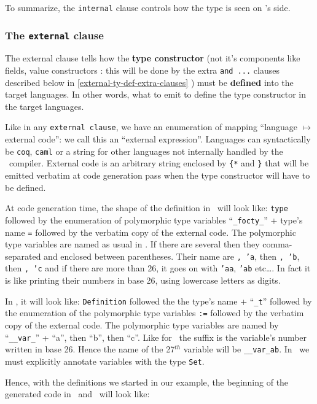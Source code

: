 \medskip
To summarize, the {\tt internal} clause controls how the type is seen
on \focalize's side.


\subsubsection{The {\tt external} clause}
The external clause tells how the {\bf type constructor} (not it's
components like fields, value constructors : this will be done by the
extra {\tt and ...} clauses described below in
\ref{external-ty-def-extra-clauses} ) must be {\bf defined} into the
target languages. In other words, what to emit to define the type
constructor in the target languages.

Like in any {\tt external clause}, we have an enumeration of mapping
``language $\mapsto$ external code'': we call this an ``external
expression''.
Languages can syntactically be
{\tt coq}, {\tt caml} or a string for other languages not internally
handled by the \focalize\ compiler. External code is an arbitrary
string enclosed by {\tt \{*} and {\tt *\}} that will be emitted
verbatim at code generation pass when the type constructor will have
to be defined.

At code generation time, the shape of the definition in \ocaml\ will
look like: {\tt type} followed by the enumeration of polymorphic type
variables ``{\tt \_focty\_}'' + type's name {\tt =} followed by the
verbatim copy of the external code. The polymorphic type variables are
named as usual in \ocaml. If there are several then they
comma-separated and enclosed between parentheses. Their name are
{\tt, 'a}, then {\tt, 'b}, then {\tt, 'c} and if there are more than
26, it goes on with {\tt 'aa}, {\tt 'ab} etc\ldots. In fact it is like
printing their numbers in base 26, using lowercase letters as digits.

In \coq, it will look like: {\tt Definition} followed the the type's
name + ``{\tt \_t}'' followed by the enumeration of the polymorphic
type variables {\tt :=} followed by the verbatim copy of the
external code. The polymorphic type variables are named by
``{\tt \_\_var\_}'' + ``a'', then ``b'', then ``c''. Like for \ocaml\
the suffix is the variable's number written in base 26. Hence the name
of the 27$^{th}$ variable will be {\tt \_\_var\_ab}. In \coq\, we must
explicitly annotate variables with the type {\tt Set}.

Hence, with the definitions we started in our example, the beginning
of the generated code in \ocaml\ and \coq\ will look like:

